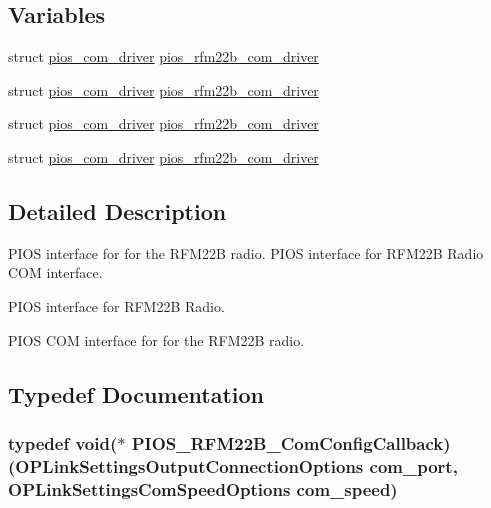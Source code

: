 \subsection*{\-Variables}
\begin{DoxyCompactItemize}
\item 
struct \hyperlink{structpios__com__driver}{pios\-\_\-com\-\_\-driver} \hyperlink{group___p_i_o_s___r_f_m22_b_gafc506e8bc70ed8b31b75cbddf28ee660}{pios\-\_\-rfm22b\-\_\-com\-\_\-driver}
\item 
struct \hyperlink{structpios__com__driver}{pios\-\_\-com\-\_\-driver} \hyperlink{group___p_i_o_s___r_f_m22_b_gafc506e8bc70ed8b31b75cbddf28ee660}{pios\-\_\-rfm22b\-\_\-com\-\_\-driver}
\item 
struct \hyperlink{structpios__com__driver}{pios\-\_\-com\-\_\-driver} \hyperlink{group___p_i_o_s___r_f_m22_b_gafc506e8bc70ed8b31b75cbddf28ee660}{pios\-\_\-rfm22b\-\_\-com\-\_\-driver}
\item 
struct \hyperlink{structpios__com__driver}{pios\-\_\-com\-\_\-driver} \hyperlink{group___p_i_o_s___r_f_m22_b_gafc506e8bc70ed8b31b75cbddf28ee660}{pios\-\_\-rfm22b\-\_\-com\-\_\-driver}
\end{DoxyCompactItemize}


\subsection{\-Detailed \-Description}
\-P\-I\-O\-S interface for for the \-R\-F\-M22\-B radio. \-P\-I\-O\-S interface for \-R\-F\-M22\-B \-Radio \-C\-O\-M interface.

\-P\-I\-O\-S interface for \-R\-F\-M22\-B \-Radio.

\-P\-I\-O\-S \-C\-O\-M interface for for the \-R\-F\-M22\-B radio. 

\subsection{\-Typedef \-Documentation}
\hypertarget{group___p_i_o_s___r_f_m22_b_gaa8a316480e010f5e383d29257c0686cd}{
\subsubsection[{\-P\-I\-O\-S\-\_\-\-R\-F\-M22\-B\-\_\-\-Com\-Config\-Callback}]{\setlength{\rightskip}{0pt plus 5cm}typedef void($\ast$ {\bf \-P\-I\-O\-S\-\_\-\-R\-F\-M22\-B\-\_\-\-Com\-Config\-Callback})({\bf \-O\-P\-Link\-Settings\-Output\-Connection\-Options} com\-\_\-port, {\bf \-O\-P\-Link\-Settings\-Com\-Speed\-Options} com\-\_\-speed)}}\label{group___p_i_o_s___r_f_m22_b_gaa8a316480e010f5e383d29257c0686cd}


